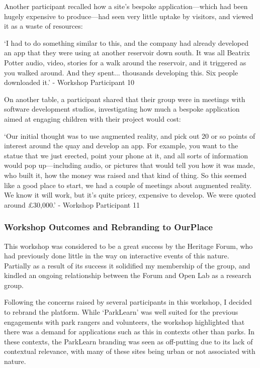 Another participant recalled how a site's bespoke application---which had been hugely expensive to produce---had seen very little uptake by visitors, and viewed it as a waste of resources:

\begin{displayquote}
`I had to do something similar to this, and the company had already developed an app that they were using at another reservoir down south. It was all Beatrix Potter audio, video, stories for a walk around the reservoir, and it triggered as you walked around. And they spent... thousands developing this. Six people downloaded it.' - Workshop Participant 10
\end{displayquote}

On another table, a participant shared that their group were in meetings with software development studios, investigating how much a bespoke application aimed at engaging children with their project would cost:

\begin{displayquote}
`Our initial thought was to use augmented reality, and pick out 20 or so points of interest around the quay and develop an app. For example, you want to the statue that we just erected, point your phone at it, and all sorts of information would pop up---including audio, or pictures that would tell you how it was made, who built it, how the money was raised and that kind of thing. So this seemed like a good place to start, we had a couple of meetings about augmented reality. We know it will work, but it's quite pricey, expensive to develop. We were quoted around £30,000.' - Workshop Participant 11
\end{displayquote}

\subsubsection{Workshop Outcomes and Rebranding to OurPlace}
This workshop was considered to be a great success by the Heritage Forum, who had previously done little in the way on interactive events of this nature. Partially as a result of its success it solidified my membership of the group, and kindled an ongoing relationship between the Forum and Open Lab as a research group.

Following the concerns raised by several participants in this workshop, I decided to rebrand the platform. While `ParkLearn' was well suited for the previous engagements with park rangers and volunteers, the workshop highlighted that there was a demand for applications such as this in contexts other than parks. In these contexts, the ParkLearn branding was seen as off-putting due to its lack of contextual relevance, with many of these sites being urban or not associated with nature. 

